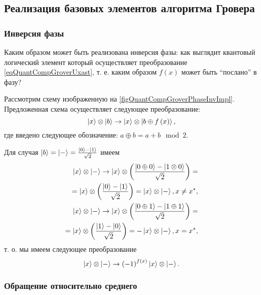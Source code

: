 \subsection{ Реализация базовых элементов алгоритма Гровера}

\subsubsection{Инверсия фазы}
Каким образом может быть реализована инверсия фазы: как выглядит
квантовый логический элемент который осуществляет преобразование
\eqref{eqQuantCompGroverUxast}, т. е. каким образом $f\left(x\right)$
может быть ``послано'' в фазу?



Рассмотрим схему изображенную на
\autoref{figQuantCompGroverPhaseInvImpl}. Предложенная схема
осуществляет следующее преобразование:
\begin{equation}
\ket{x}\otimes\ket{b} \rightarrow 
\ket{x}\otimes\left|b\oplus f\left(x\right)\right>,
\nonumber
\end{equation}
где введено следующее обозначение: $a \oplus b = a + b \mod 2$.

Для случая $\ket{b} = \ket{-} = 
\frac{\ket{0} - \ket{1}}{\sqrt{2}}$ имеем
\begin{eqnarray}
\ket{x}\otimes\ket{-} \rightarrow 
\ket{x}\otimes\left(\frac{\left|0\oplus 0\right> -
  \left|1\otimes 0\right>}{\sqrt{2}}\right) = 
\nonumber \\
= \ket{x}\otimes\left(\frac{\ket{0} -
  \ket{1}}{\sqrt{2}}\right) =
\ket{x}\otimes\ket{-}
, x \ne x^{\ast},
\nonumber \\
\ket{x}\otimes\ket{-} \rightarrow 
\ket{x}\otimes\left(\frac{\left|0\oplus 1\right> -
  \left|1\oplus 1\right>}{\sqrt{2}}\right) = 
\nonumber \\
= \ket{x}\otimes\left(\frac{\ket{1} -
  \ket{0}}{\sqrt{2}}\right) =
- \ket{x}\otimes\ket{-}
, x = x^{\ast},
\nonumber
\end{eqnarray}
т. о. мы имеем следующее преобразование
\begin{equation}
\ket{x}\otimes\ket{-} \rightarrow 
\left(-1\right)^{f\left(x\right)}\ket{x}\otimes\ket{-}.
\label{eqQuantCompGroverPhaseInvImpl}
\end{equation}

\subsubsection{Обращение относительно среднего}

